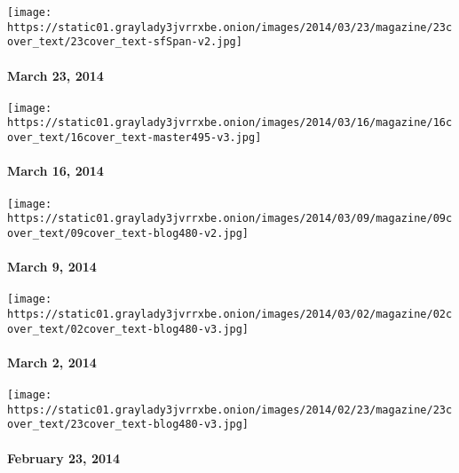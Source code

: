 \href{http://www.nytimes3xbfgragh.onion/indexes/2014/03/23/magazine/index.html}{}

\texttt{[image: https://static01.graylady3jvrrxbe.onion/images/2014/03/23/magazine/23cover\_text/23cover\_text-sfSpan-v2.jpg]}

\hypertarget{march-23-2014}{%
\paragraph{March 23, 2014}\label{march-23-2014}}

\href{http://www.nytimes3xbfgragh.onion/indexes/2014/03/16/magazine/index.html}{}

\texttt{[image: https://static01.graylady3jvrrxbe.onion/images/2014/03/16/magazine/16cover\_text/16cover\_text-master495-v3.jpg]}

\hypertarget{march-16-2014}{%
\paragraph{March 16, 2014}\label{march-16-2014}}

\href{http://www.nytimes3xbfgragh.onion/indexes/2014/03/09/magazine/index.html}{}

\texttt{[image: https://static01.graylady3jvrrxbe.onion/images/2014/03/09/magazine/09cover\_text/09cover\_text-blog480-v2.jpg]}

\hypertarget{march-9-2014}{%
\paragraph{March 9, 2014}\label{march-9-2014}}

\href{http://www.nytimes3xbfgragh.onion/indexes/2014/03/02/magazine/index.html}{}

\texttt{[image: https://static01.graylady3jvrrxbe.onion/images/2014/03/02/magazine/02cover\_text/02cover\_text-blog480-v3.jpg]}

\hypertarget{march-2-2014}{%
\paragraph{March 2, 2014}\label{march-2-2014}}

\href{http://www.nytimes3xbfgragh.onion/indexes/2014/02/23/magazine/index.html}{}

\texttt{[image: https://static01.graylady3jvrrxbe.onion/images/2014/02/23/magazine/23cover\_text/23cover\_text-blog480-v3.jpg]}

\hypertarget{february-23-2014}{%
\paragraph{February 23, 2014}\label{february-23-2014}}

